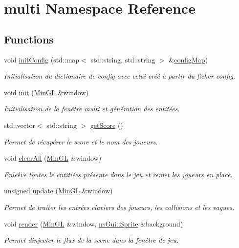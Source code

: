 \hypertarget{namespacemulti}{}\section{multi Namespace Reference}
\label{namespacemulti}
\subsection*{Functions}
\begin{DoxyCompactItemize}
\item 
void \hyperlink{namespacemulti_a916253e013641aaa278947378b6c816a}{init\+Config} (std\+::map$<$ std\+::string, std\+::string $>$ \&\hyperlink{main_8cpp_ada2160bcc2082e595d02f0eb5a318dd5}{config\+Map})
\begin{DoxyCompactList}\small\item\em Initialisation du dictionaire de config avec celui créé à partir du ficher config. \end{DoxyCompactList}\item 
void \hyperlink{namespacemulti_a7d4e2144fca3a548868c821d3d5a17cc}{init} (\hyperlink{class_min_g_l}{Min\+GL} \&window)
\begin{DoxyCompactList}\small\item\em Initialisation de la fenêtre multi et génération des entitées. \end{DoxyCompactList}\item 
std\+::vector$<$ std\+::string $>$ \hyperlink{namespacemulti_a673529b0ff995893d952dd68c10b5764}{get\+Score} ()
\begin{DoxyCompactList}\small\item\em Permet de récupérer le score et le nom des joueurs. \end{DoxyCompactList}\item 
void \hyperlink{namespacemulti_aaddb7d8c21297c2b3d2c796964b6f561}{clear\+All} (\hyperlink{class_min_g_l}{Min\+GL} \&window)
\begin{DoxyCompactList}\small\item\em Enleève toutes le entitiées présente dans le jeu et remet les joueurs en place. \end{DoxyCompactList}\item 
unsigned \hyperlink{namespacemulti_a528a68b538d7acc3bb08661522585e4a}{update} (\hyperlink{class_min_g_l}{Min\+GL} \&window)
\begin{DoxyCompactList}\small\item\em Permet de traiter les entrées claviers des joueurs, les collisions et les vagues. \end{DoxyCompactList}\item 
void \hyperlink{namespacemulti_a2ece1e3aedf924d21b2ef9f2f2f9140c}{render} (\hyperlink{class_min_g_l}{Min\+GL} \&window, \hyperlink{classns_gui_1_1_sprite}{ns\+Gui\+::\+Sprite} \&background)
\begin{DoxyCompactList}\small\item\em Permet d\textquotesingle{}injecter le flux de la scene dans la fenêtre de jeu. \end{DoxyCompactList}\end{DoxyCompactItemize}



